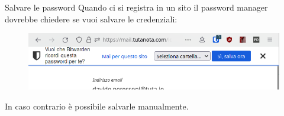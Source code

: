 \begin{myframe}{Salvare le password}
  Quando ci si registra in un sito il password manager dovrebbe chiedere se vuoi salvare le credenziali:

  \begin{figure}
    \includegraphics[width=\textwidth]{img/savepass}
  \end{figure}

  \medskip\pause
  In caso contrario è possibile salvarle manualmente.
\end{myframe}
